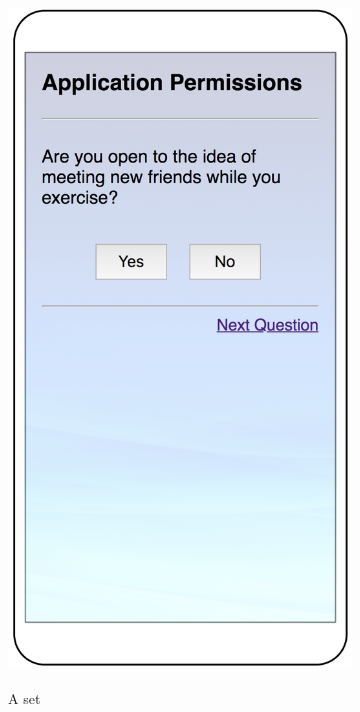 \begin{figure}
	\centering
	\begin{subfigure}[b]{0.24\textheight}
		\includegraphics[width=0.24\textheight]{figures/indirect1.png}
		\label{fig:indirecta}
		\caption{A set}
	\end{subfigure}
	\begin{subfigure}[b]{0.24\textheight}

\end{subfigure}
\end{figure}

